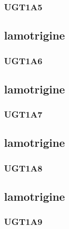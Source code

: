 \documentclass{book}
\begin{document}
\subsubsection{ UGT1A5 }

\begin{center}



\end{center}\subsection{ lamotrigine }


\subsubsection{ UGT1A6 }

\begin{center}



\end{center}\subsection{ lamotrigine }


\subsubsection{ UGT1A7 }

\begin{center}



\end{center}\subsection{ lamotrigine }


\subsubsection{ UGT1A8 }

\begin{center}



\end{center}\subsection{ lamotrigine }


\subsubsection{ UGT1A9 }
\end{document}
